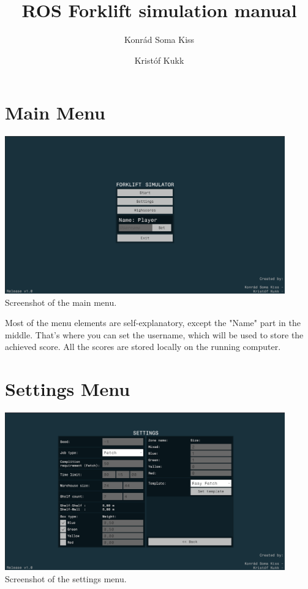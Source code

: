 \documentclass{article}
\title{ROS Forklift simulation manual}
\author{Konrád Soma Kiss \and Kristóf Kukk}
\date{}
\begin{document}
\maketitle

\pagebreak

\tableofcontents

\pagebreak

\section{Main Menu}
\begin{center}
    \includegraphics[width=12.1cm]{main_menu}\linebreak
    \small Screenshot of the main menu.
\end{center}

\normalsize
Most of the menu elements are self-explanatory, except the "Name" part in the middle.
That's where you can set the username, which will be used to store the achieved score.
All the scores are stored locally on the running computer.

\pagebreak

\section{Settings Menu}
\begin{center}
    \includegraphics[width=12.1cm]{settings_menu}\linebreak
    \small Screenshot of the settings menu.
\end{center}
\end{document}
